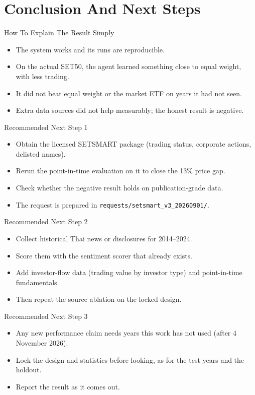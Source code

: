 \documentclass[aspectratio=43,10pt]{beamer}
\begin{document}
\section{Conclusion And Next Steps}

\begin{frame}{How To Explain The Result Simply}
\begin{itemize}
  \item The system works and its runs are reproducible.
  \item On the actual SET50, the agent learned something close to equal weight, with less trading.
  \item It did not beat equal weight or the market ETF on years it had not seen.
  \item Extra data sources did not help measurably; the honest result is negative.
\end{itemize}
\end{frame}

\begin{frame}{Recommended Next Step 1}
\begin{itemize}
  \item Obtain the licensed SETSMART package (trading status, corporate actions, delisted names).
  \item Rerun the point-in-time evaluation on it to close the 13\% price gap.
  \item Check whether the negative result holds on publication-grade data.
  \item The request is prepared in \texttt{requests/setsmart\_v3\_20260901/}.
\end{itemize}
\end{frame}

\begin{frame}{Recommended Next Step 2}
\begin{itemize}
  \item Collect historical Thai news or disclosures for 2014--2024.
  \item Score them with the sentiment scorer that already exists.
  \item Add investor-flow data (trading value by investor type) and point-in-time fundamentals.
  \item Then repeat the source ablation on the locked design.
\end{itemize}
\end{frame}

\begin{frame}{Recommended Next Step 3}
\begin{itemize}
  \item Any new performance claim needs years this work has not used (after 4 November 2026).
  \item Lock the design and statistics before looking, as for the test years and the holdout.
  \item Report the result as it comes out.
\end{itemize}
\end{frame}
\end{document}
